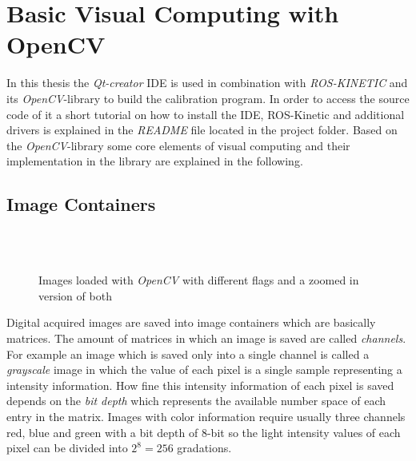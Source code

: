 \chapter{Basic Visual Computing with OpenCV}
\label{chap:basicvisualcomputing}
In this thesis the \textit{Qt-creator} IDE is used in combination with \textit{ROS-KINETIC} and its \textit{OpenCV}-library to build the calibration program. In order to access the source code of it a short tutorial on how to install the IDE, ROS-Kinetic and additional drivers is explained in the \textit{README} file located in the project folder. Based on the \textit{OpenCV}-library some core elements of visual computing and their implementation in the library are explained in the following. 

\section{Image Containers}

\begin{figure}[h]
\centering
	\hspace{1cm}
    \\
    \hspace{1cm}
  	\\
   \caption{Images loaded with \textit{OpenCV} with different flags and a zoomed in version of both}
    \label{fig:imread}
    \end{figure}


Digital acquired images are saved into image containers which are basically matrices. The amount of matrices in which an image is saved are called \textit{channels}. For example an image which is saved only into a single channel is called a \textit{grayscale} image in which the value of each pixel is a single sample representing a intensity information. How fine this intensity information of each pixel is saved depends on the \textit{bit depth} which represents the available number space of each entry in the matrix. Images with color information require usually three channels red, blue and green with a bit depth of 8-bit so the light intensity values of each pixel can be divided into $2^8=256$ gradations.

